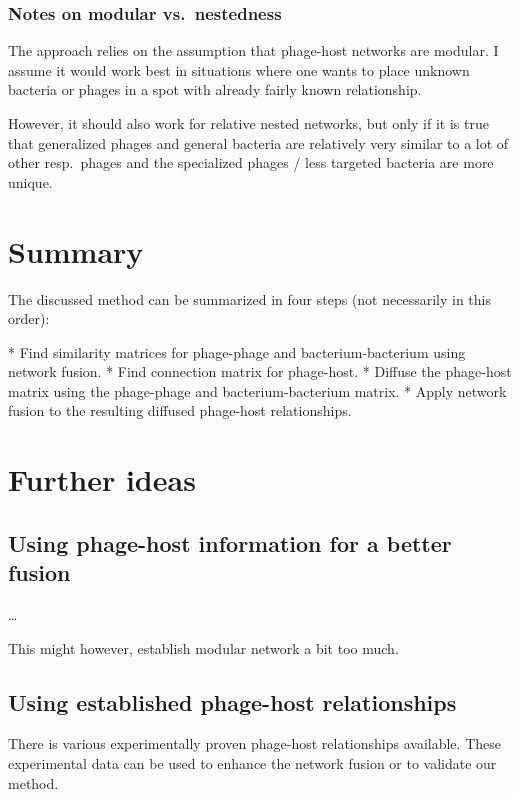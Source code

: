 \documentclass{article}
\begin{document}
\subsubsection{Notes on modular vs.\ nestedness}

The approach relies on the assumption that phage-host networks are
modular. I assume it would work best in situations where one wants to place
unknown bacteria or phages in a spot with already fairly known relationship. 

However, it should also work for relative nested networks, but only if it is 
true that generalized phages and general bacteria are relatively very 
similar to a lot of other resp.\ phages and 
the specialized phages / less targeted bacteria are more unique. 

\section{Summary}

The discussed method can be summarized in four steps (not necessarily in this order):

 * Find similarity matrices for phage-phage and bacterium-bacterium using network fusion.
 * Find connection matrix for phage-host.
 * Diffuse the phage-host matrix using the phage-phage and bacterium-bacterium matrix.
 * Apply network fusion to the resulting diffused phage-host relationships.

\section{Further ideas}

\subsection{Using phage-host information for a better fusion}

\ldots

This might however, establish modular network a bit too much.

\subsection{Using established phage-host relationships}

There is various experimentally proven phage-host relationships available. 
These experimental data can be used to enhance the network fusion or 
to validate our method. 
\end{document}
